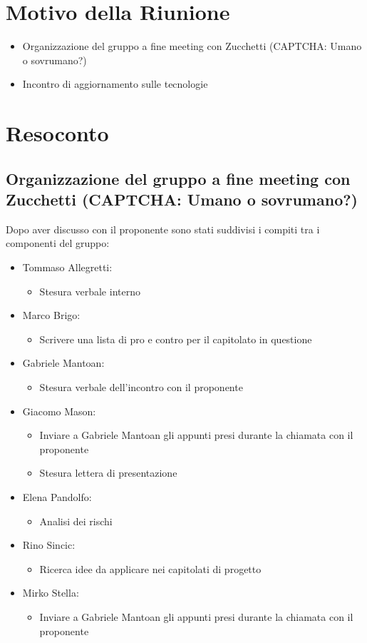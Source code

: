 \section{Motivo della Riunione}
\begin{itemize}
    \item Organizzazione del gruppo a fine meeting con Zucchetti (CAPTCHA: Umano o sovrumano?)
    \item Incontro di aggiornamento sulle tecnologie
\end{itemize}
\section{Resoconto}
\subsection{Organizzazione del gruppo a fine meeting con Zucchetti (CAPTCHA: Umano o sovrumano?)}
Dopo aver discusso con il proponente sono stati suddivisi i compiti tra i componenti del gruppo:
\begin{itemize}
    \item Tommaso Allegretti:
    \begin{itemize}
        \item Stesura verbale interno 
    \end{itemize}
    \item Marco Brigo:
    \begin{itemize}
        \item Scrivere una lista di pro e contro per il capitolato in questione
    \end{itemize}
    \item Gabriele Mantoan:
    \begin{itemize}
        \item Stesura verbale dell'incontro con il proponente
    \end{itemize}
    \item Giacomo Mason:
    \begin{itemize}
        \item Inviare a Gabriele Mantoan gli appunti presi durante la chiamata con il proponente
        \item Stesura lettera di presentazione
    \end{itemize}
    \item Elena Pandolfo:
    \begin{itemize}
        \item Analisi dei rischi
    \end{itemize}
    \item Rino Sincic:
    \begin{itemize}
        \item Ricerca idee da applicare nei capitolati di progetto
    \end{itemize}
    \item Mirko Stella:
    \begin{itemize}
        \item Inviare a Gabriele Mantoan gli appunti presi durante la chiamata con il proponente
    \end{itemize}
\end{itemize}

